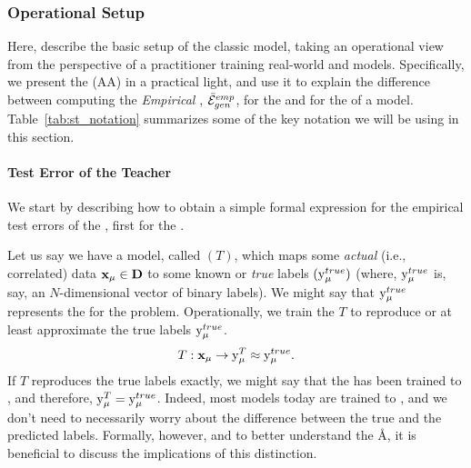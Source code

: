 \subsubsection{Operational Setup}
\label{sxn:ST_OP_setup}


Here, describe the basic setup of the classic \StudentTeacher model, taking an operational view from the perspective of a practitioner training real-world \Student and \Teacher models.  Specifically, we present the \AnnealedApproximation (AA) in a practical light,
and use it to explain the difference between computing the \emph{Empirical \GeneralizationError}, $\bar{\mathcal{E}}^{emp}_{gen}$, for the \emph{\TrueAccuracy}
and for the \emph{\Precision} of a \Teacher model. Table~\ref{tab:st_notation} summarizes some of the key notation we will be using in this section.


\paragraph{Test Error of the Teacher}

We start by describing how to obtain a simple formal expression for the empirical test errors of the \Teacher, first for the \TrueAccuracy.

Let us say we have a model, called \Teacher $(T)$, which maps some \emph{actual} (i.e., correlated) data
$\mathbf{x}_{\mu}\in\mathbf{D}$ to some known or \emph{true}  labels $(\mathrm{y}_{\mu}^{true})$
(where,  $\mathrm{y}_{\mu}^{true}$ is, say, an $N$-dimensional vector of binary labels).
We might say that $\mathrm{y}_{\mu}^{true}$ represents the \emph{\GroundTruth} for the problem.
Operationally, we train the \Teacher $T$ to reproduce or at least approximate the true labels $\mathrm{y}_{\mu}^{true}$.
\begin{align}
 T:\mathbf{x}_{\mu}\rightarrow \mathrm{y}_{\mu}^{T} \approx \mathrm{y}_{\mu}^{true}.
\end{align}
If $T$ reproduces the true labels exactly, we might say that the \Teacher has been
trained to \emph{\Interpolation}, and therefore, $\mathrm{y}_{\mu}^{T} = \mathrm{y}_{\mu}^{true}$.
Indeed, most models today are trained to \emph{\Interpolation}, and we don't need to
necessarily worry about the difference between the true and the predicted \Teacher labels.
Formally, however, and to better understand the \AA, it is beneficial to discuss the implications
of this distinction.

